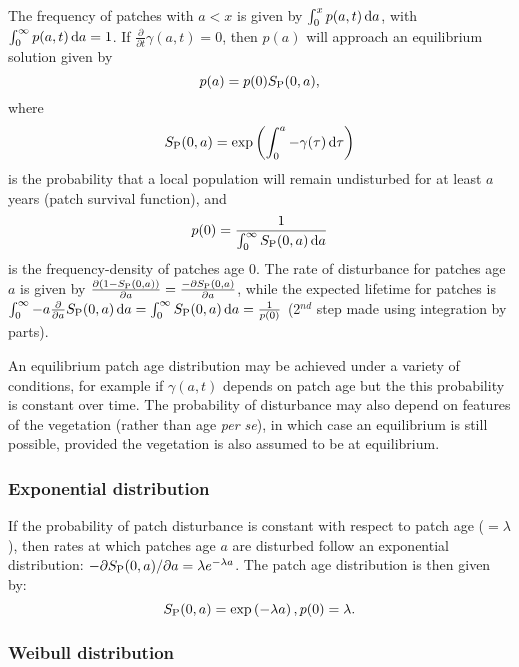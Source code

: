 \documentclass[10pt,twoside]{article}
\begin{document}
The frequency of patches with \(a < x\) is given by
\(\int_{0}^{x}p(a,t) \, {\rm d}a\), with
\(\int_{0}^{\infty} p(a,t) \, {\rm d}a =1\). If
\(\frac{\partial}{\partial t}\gamma(a,t)=0\), then \(p(a)\) will
approach an equilibrium solution given by \[p(a) = p(0) S_{\rm P}(0,a),\] where
\[S_{\rm P}(0,a) = \exp \left( \int_{0}^{a}-\gamma(\tau)\,{\rm d}\tau\right)\]
is the probability that a local population will remain undisturbed for
at least \(a\) years (patch survival function), and
\[p(0) = \frac1{ \int_{0}^{\infty}S_{\rm P}(0,a) \,{\rm d}a}\] is the
frequency-density of patches age 0. The rate of disturbance for patches
age \(a\) is given by
\(\frac{\partial (1-S_{\rm P}(0,a))}{\partial a} = \frac{-\partial S_{\rm P}(0,a)}{\partial a}\),
while the expected lifetime for patches is
\(\int_0^\infty - a \frac{\partial}{\partial a} S_{\rm P}(0,a) \, {\rm d} a = \int_0^\infty S_{\rm P}(0,a) \, {\rm d} a = \frac1{p(0)}\)
(2\(^{nd}\) step made using integration by parts).

An equilibrium patch age distribution may be achieved under a variety of
conditions, for example if \(\gamma(a,t)\) depends on patch age but the
this probability is constant over time. The probability of disturbance
may also depend on features of the vegetation (rather than age \emph{per
se}), in which case an equilibrium is still possible, provided the
vegetation is also assumed to be at equilibrium.

\subsubsection{Exponential distribution}\label{exponential-distribution}

If the probability of patch disturbance is constant with respect to
patch age (\(=\lambda\)), then rates at which patches age \(a\) are
disturbed follow an exponential distribution:
\(-\partial S_{\rm P}(0,a)/ \partial a = \lambda e^{-\lambda a}\). The patch age
distribution is then given by:
\[ S_{\rm P}(0,a) = \exp\left(-\lambda a\right), p(0) = \lambda.\]

\subsubsection{Weibull distribution}\label{weibull-distribution}
\end{document}
